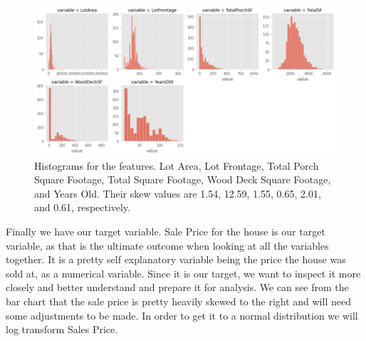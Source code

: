 \documentclass{article}
\begin{document}
	\begin{figure}[H]
		\includegraphics[width=\textwidth]{skewplots}
		\caption{Histograms for the features. Lot Area, Lot Frontage, Total Porch Square Footage, Total Square Footage, Wood Deck Square Footage, and Years Old. Their skew values are 1.54, 12.59, 1.55, 0.65, 2.01, and 0.61, respectively.}
		\label{fig:skew}
	\end{figure}
	
		
	
	Finally we have our target variable. Sale Price for the house is our target variable, as that is the ultimate outcome when looking at all the variables together. It is a pretty self explanatory variable being the price the house was sold at, as a numerical variable. Since it is our target, we want to inspect it more closely and better understand and prepare it for analysis. We can see from the bar chart that the sale price is pretty heavily skewed to the right and will need some adjustments to be made. In order to get it to a normal distribution we will log transform Sales Price.

\end{document}
